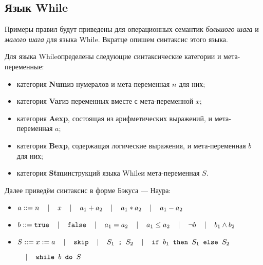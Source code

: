   \newcommand{\KWhile}[0]{{\large While}}
  \subsection{Язык \KWhile}

    \newcommand{\Num}[0]{{\bf Num}}
    \newcommand{\Var}[0]{{\bf Var}}
    \newcommand{\Aexp}[0]{{\bf Aexp}}
    \newcommand{\Bexp}[0]{{\bf Bexp}}
    \newcommand{\Stm}[0]{{\bf Stm}}

    Примеры правил будут приведены для операционных семантик \emph{большого шага} и \emph{малого шага} для языка \KWhile\cite{Nielson:1992:SAF:129085}. Вкратце опишем синтаксис этого языка.

    Для языка \KWhile \ccode{ }определены следующие синтаксические категории и мета-переменные:
    \begin{itemize}
       \item категория \Num \ccode{ }из нумералов и мета-переменная $n$ для них;
       \item категория \Var \ccode{ }из переменных вместе с мета-переменной $x$;
       \item категория \Aexp, состоящая из арифметических выражений, и мета-переменная $a$;
       \item категория \Bexp, содержащая логические выражения, и мета-переменная $b$ для них;
       \item категория \Stm \ccode{ }инструкций языка \KWhile \ccode{ }и мета-переменная $S$.
    \end{itemize}
    
    \vspace{4mm}
    Далее приведём синтаксис в форме Бэкуса --- Наура:

    \newcommand{\sep}[0]{\hspace{4mm} | \hspace{4mm}}
    \begin{itemize}
    \item[] $a ::= n            \sep x             \sep a_1 + a_2 \sep a_1 * a_2    \sep a_1 - a_2                     $
    \item[] $b ::= \ccode{true} \sep \ccode{false} \sep a_1 = a_2 \sep a_1 \leq a_2 \sep \neg b    \sep b_1 \wedge b_2 $
    \item[] $S ::= x := a       \sep \ccode{skip}  \sep S_1 \ccode{ ; } S_2
                                \sep \ccode{if } b_1 \ccode{ then } S_1 \ccode{ else } S_2$
    
                 \hspace{8cm} $ \sep \ccode{while } b \ccode{ do } S $
    \end{itemize}

